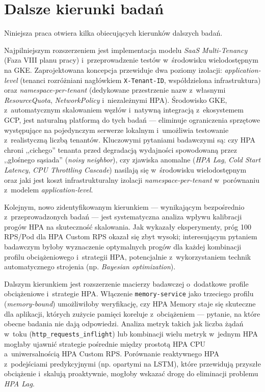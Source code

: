 \section{Dalsze kierunki badań}

Niniejsza praca otwiera kilka obiecujących kierunków dalszych badań.

Najpilniejszym rozszerzeniem jest implementacja modelu \textit{SaaS Multi-Tenancy} (Faza VIII planu pracy) i~przeprowadzenie testów w~środowisku wielodostępnym na GKE. Zaprojektowana koncepcja przewiduje dwa poziomy izolacji: \textit{application-level} (tenanci rozróżniani nagłówkiem \texttt{X-Tenant-ID}, współdzielona infrastruktura) oraz \textit{namespace-per-tenant} (dedykowane przestrzenie nazw z~własnymi \textit{ResourceQuota}, \textit{NetworkPolicy} i~niezależnymi HPA). Środowisko GKE, z~automatycznym skalowaniem węzłów i~natywną integracją z~ekosystemem GCP, jest naturalną platformą do tych badań — eliminuje ograniczenia sprzętowe występujące na pojedynczym serwerze lokalnym i~umożliwia testowanie z~realistyczną liczbą tenantów. Kluczowymi pytaniami badawczymi są: czy HPA chroni ,,cichego'' tenanta przed degradacją wydajności spowodowaną przez ,,głośnego sąsiada'' (\textit{noisy neighbor}), czy zjawiska anomalne (\textit{HPA Lag}, \textit{Cold Start Latency}, \textit{CPU Throttling Cascade}) nasilają się w~środowisku wielodostępnym oraz jaki jest koszt infrastrukturalny izolacji \textit{namespace-per-tenant} w~porównaniu z~modelem \textit{application-level}.

Kolejnym, nowo zidentyfikowanym kierunkiem — wynikającym bezpośrednio z~przeprowadzonych badań — jest systematyczna analiza wpływu kalibracji progów HPA na skuteczność skalowania. Jak wykazały eksperymenty, próg 100 RPS/Pod dla HPA Custom RPS okazał się zbyt wysoki; interesującym pytaniem badawczym byłoby wyznaczenie optymalnych progów dla każdej kombinacji profilu obciążeniowego i~strategii HPA, potencjalnie z~wykorzystaniem technik automatycznego strojenia (np. \textit{Bayesian optimization}).

Dalszym kierunkiem jest rozszerzenie macierzy badawczej o~dodatkowe profile obciążeniowe i~strategie HPA. Włączenie \texttt{memory-service} jako trzeciego profilu (\textit{memory-bound}) umożliwiłoby weryfikację, czy HPA Memory staje się skuteczne dla aplikacji, których zużycie pamięci koreluje z~obciążeniem — pytanie, na które obecne badania nie dają odpowiedzi. Analiza metryk takich jak liczba żądań w~toku (\texttt{http\_requests\_inflight}) lub kombinacji wielu metryk w~jednym HPA mogłaby ujawnić strategie pośrednie między prostotą HPA CPU a~uniwersalnością HPA Custom RPS. Porównanie reaktywnego HPA z~podejściami predykcyjnymi (np. opartymi na LSTM), które przewidują przyszłe obciążenie i~skalują proaktywnie, mogłoby wskazać drogę do eliminacji problemu \textit{HPA Lag}.

